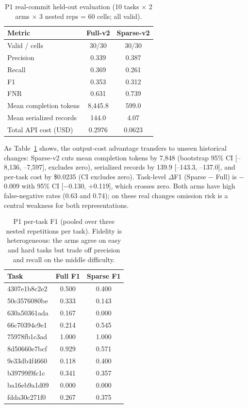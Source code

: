 \begin{table}[t]
\caption{P1 real-commit held-out evaluation (10 tasks $\times$ 2 arms $\times$
3 nested reps = 60 cells; all valid).}
\label{tab:p1}
\centering
\small
\begin{tabular}{lcc}
\toprule
\textbf{Metric} & \textbf{Full-v2} & \textbf{Sparse-v2} \\
\midrule
Valid / cells & 30/30 & 30/30 \\
Precision & 0.339 & 0.387 \\
Recall & 0.369 & 0.261 \\
F1 & 0.353 & 0.312 \\
FNR & 0.631 & 0.739 \\
Mean completion tokens & 8,445.8 & 599.0 \\
Mean serialized records & 144.0 & 4.07 \\
Total API cost (USD) & 0.2976 & 0.0623 \\
\bottomrule
\end{tabular}
\end{table}

As Table~\ref{tab:p1} shows, the output-cost advantage transfers to unseen
historical changes: Sparse-v2 cuts mean completion tokens by 7,848
(bootstrap 95\% CI [--8,136, --7,597], excludes zero), serialized records by
139.9 [--143.3, --137.0], and per-task cost by \$0.0235 (CI excludes zero).
Task-level $\Delta$F1 (Sparse $-$ Full) is $-$0.009 with 95\% CI
[$-$0.130, $+$0.119], which crosses zero. Both arms have high false-negative
rates (0.63 and 0.74); on these real changes omission risk is a central
weakness for both representations.

\begin{table}[t]
\caption{P1 per-task F1 (pooled over three nested repetitions per task).
Fidelity is heterogeneous: the arms agree on easy and hard tasks but trade off
precision and recall on the middle difficulty.}
\label{tab:p1tasks}
\centering
\scriptsize
\setlength{\tabcolsep}{3pt}
\begin{tabular}{lcc}
\toprule
\textbf{Task} & \textbf{Full F1} & \textbf{Sparse F1} \\
\midrule
4307e1b8c2e2 & 0.500 & 0.400 \\
50c3576080be & 0.333 & 0.143 \\
630a50361ada & 0.167 & 0.000 \\
66c70394c9e1 & 0.214 & 0.545 \\
75978fb1c3ad & 1.000 & 1.000 \\
8d50660e7bcf & 0.929 & 0.571 \\
9e33db4f4660 & 0.118 & 0.400 \\
b39799f9fc1c & 0.341 & 0.357 \\
ba16eb9a1d09 & 0.000 & 0.000 \\
fdda30c271f0 & 0.267 & 0.375 \\
\bottomrule
\end{tabular}
\end{table}


